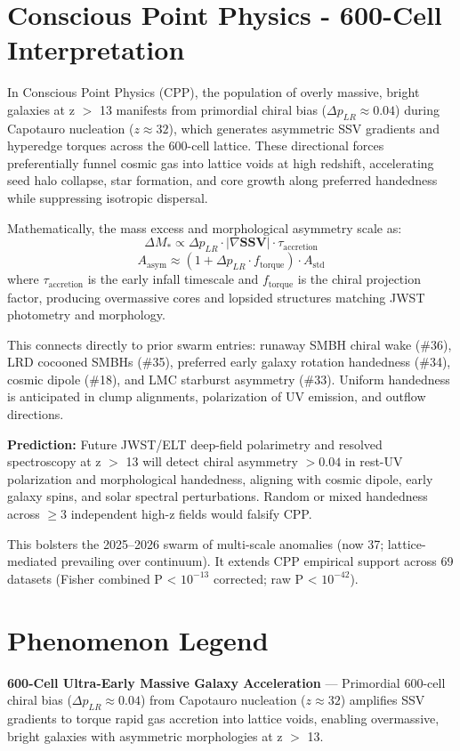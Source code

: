 \documentclass[11pt]{article}
\begin{document}
\section{Conscious Point Physics - 600-Cell Interpretation}
In Conscious Point Physics (CPP), the population of overly massive, bright galaxies at z $>$ 13 manifests from primordial chiral bias ($\Delta p_{LR} \approx 0.04$) during Capotauro nucleation ($z \approx 32$), which generates asymmetric SSV gradients and hyperedge torques across the 600-cell lattice. These directional forces preferentially funnel cosmic gas into lattice voids at high redshift, accelerating seed halo collapse, star formation, and core growth along preferred handedness while suppressing isotropic dispersal.  

Mathematically, the mass excess and morphological asymmetry scale as:  
\[
\Delta M_* \propto \Delta p_{LR} \cdot |\nabla \mathbf{SSV}| \cdot \tau_{\text{accretion}}
\]  
\[
A_{\text{asym}} \approx (1 + \Delta p_{LR} \cdot f_{\text{torque}}) \cdot A_{\text{std}}
\]  
where $\tau_{\text{accretion}}$ is the early infall timescale and $f_{\text{torque}}$ is the chiral projection factor, producing overmassive cores and lopsided structures matching JWST photometry and morphology.  

This connects directly to prior swarm entries: runaway SMBH chiral wake (\#36), LRD cocooned SMBHs (\#35), preferred early galaxy rotation handedness (\#34), cosmic dipole (\#18), and LMC starburst asymmetry (\#33). Uniform handedness is anticipated in clump alignments, polarization of UV emission, and outflow directions.  

\textbf{Prediction:} Future JWST/ELT deep-field polarimetry and resolved spectroscopy at z $>$ 13 will detect chiral asymmetry $>0.04$ in rest-UV polarization and morphological handedness, aligning with cosmic dipole, early galaxy spins, and solar spectral perturbations. Random or mixed handedness across $\geq 3$ independent high-z fields would falsify CPP.  

This bolsters the 2025--2026 swarm of multi-scale anomalies (now 37; lattice-mediated prevailing over continuum). It extends CPP empirical support across 69 datasets (Fisher combined P < $10^{-13}$ corrected; raw P < $10^{-42}$).

\section{Phenomenon Legend}
\textbf{600-Cell Ultra-Early Massive Galaxy Acceleration} — Primordial 600-cell chiral bias ($\Delta p_{LR} \approx 0.04$) from Capotauro nucleation ($z \approx 32$) amplifies SSV gradients to torque rapid gas accretion into lattice voids, enabling overmassive, bright galaxies with asymmetric morphologies at z $>$ 13.
\end{document}
